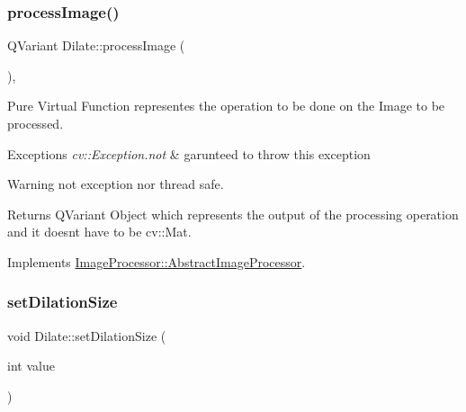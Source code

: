 \subsubsection{\texorpdfstring{process\+Image()}{processImage()}\hspace{0.1cm}{\footnotesize\ttfamily [2/2]}}
{\footnotesize\ttfamily Q\+Variant Dilate\+::process\+Image (\begin{DoxyParamCaption}{ }\end{DoxyParamCaption})\hspace{0.3cm}{\ttfamily [override]}, {\ttfamily [virtual]}}



Pure Virtual Function representes the operation to be done on the Image to be processed. 


\begin{DoxyExceptions}{Exceptions}
{\em cv\+::\+Exception.\+not} & garunteed to throw this exception \\
\hline
\end{DoxyExceptions}
\begin{DoxyWarning}{Warning}
not exception nor thread safe. 
\end{DoxyWarning}
\begin{DoxyReturn}{Returns}
Q\+Variant Object which represents the output of the processing operation and it doesn\textquotesingle{}t have to be cv\+::\+Mat. 
\end{DoxyReturn}


Implements \hyperlink{class_image_processor_1_1_abstract_image_processor_ad033ae911918b0f6842b7b1d6cdd2b90}{Image\+Processor\+::\+Abstract\+Image\+Processor}.

\mbox{\label{class_image_processor_1_1_dilate_addfbd49b040fc54c9a8985c764f4a144}} 
\subsubsection{\texorpdfstring{set\+Dilation\+Size}{setDilationSize}}
{\footnotesize\ttfamily void Dilate\+::set\+Dilation\+Size (\begin{DoxyParamCaption}\item[{int}]{value }\end{DoxyParamCaption})\hspace{0.3cm}{\ttfamily [slot]}}



